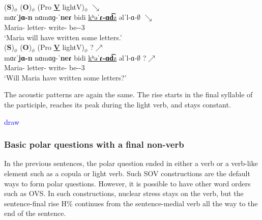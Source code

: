 \begin{exe}
	\ex \begin{xlist}
		\ex \glll (\textbf{S})$_\phi$ (\textbf{O})$_\phi$ (Pro \textbf{\underline{V}} lightV)$_\phi$ $\searrow$ \\
		mɑɾˈ\textbf{jɑ-n} nɑmɑɡ-ˈ\textbf{neɾ}  bidi \underline{kʰəˈ\textbf{ɾ-ɑd͡}z} əlˈl-ɑ-$\emptyset$ $\searrow$\\
		Maria-{} letter-{\pl} {\fut} write-{\rptcp} be-{\thgloss}-3{\sg}  \\
		\trans `Maria will have written some letters.' 
		\label{example:intonation:focus:polar:basic:cl:light:dec}
		\\ 
		\ex \glll (\textbf{S})$_\phi$ (\textbf{O})$_\phi$ (Pro \textbf{\underline{V}} lightV)$_\phi$ ?$\nearrow$ \\
		mɑɾˈ\textbf{jɑ-n} nɑmɑɡ-ˈ\textbf{neɾ}  bidi \underline{kʰəˈ\textbf{ɾ-ɑd͡}z} əlˈl-ɑ-$\emptyset$ ?$\nearrow$\\
		Maria-{} letter-{\pl} {\fut} write-{\rptcp} be-{\thgloss}-3{\sg}  \\
		\trans `Will Maria   have written some letters?' 
		\label{example:intonation:focus:polar:basic:cl:light:polar}
		\\ 
		
	\end{xlist}
\end{exe}

The acoustic patterns are again the same. The rise starts in the final syllable of the participle, reaches its peak during the light verb, and stays constant. 


\textcolor{blue}{draw}





\subsubsection{Basic polar questions with a final non-verb}\label{section:intonation:focus:polar:finalN}

In the previous sentences, the polar question ended in either a verb or a verb-like element such as a copula or light verb. Such SOV constructions are the default ways to form polar questions. However, it is possible to have other word orders such as OVS. In such constructions, nuclear stress stays on the verb, but the sentence-final rise H\% continues from the sentence-medial verb all the way to the end of the sentence. 

